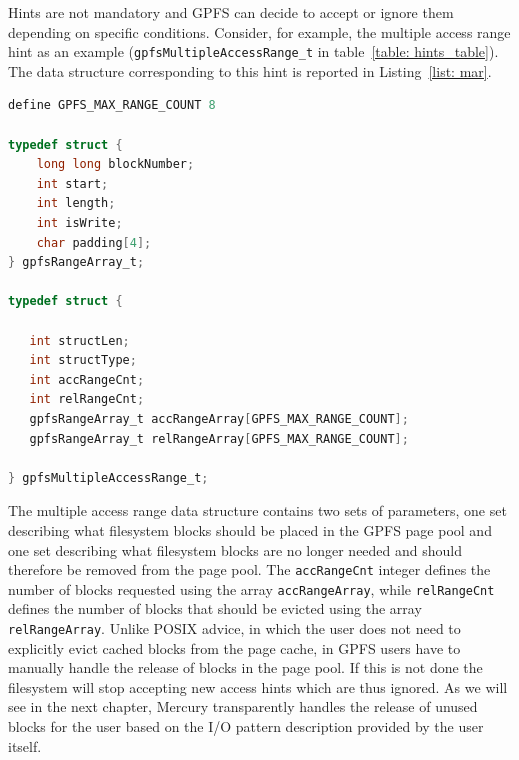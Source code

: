 Hints are not mandatory and GPFS can decide to accept or ignore them depending on specific conditions. Consider, for example, the multiple access range hint as an example (\texttt{gpfsMultipleAccessRange\_t} 
in table~\ref{table: hints_table}). The data structure corresponding to this hint is reported in Listing~\ref{list: mar}. 

\begin{lstlisting}[language=C, caption=Multiple Access Range Hint Data Structure, label={list: mar}, basicstyle=\ttfamily\scriptsize]
define GPFS_MAX_RANGE_COUNT 8

typedef struct {
    long long blockNumber;
    int start;
    int length;
    int isWrite;
    char padding[4];
} gpfsRangeArray_t;

typedef struct {

   int structLen;
   int structType;
   int accRangeCnt;
   int relRangeCnt;
   gpfsRangeArray_t accRangeArray[GPFS_MAX_RANGE_COUNT];
   gpfsRangeArray_t relRangeArray[GPFS_MAX_RANGE_COUNT];

} gpfsMultipleAccessRange_t;

\end{lstlisting}

The multiple access range data structure contains two sets of parameters, one set describing what filesystem blocks should be placed in the GPFS page pool and one set describing what filesystem blocks are 
no longer needed and should therefore be removed from the page pool. The \texttt{accRangeCnt} integer defines the number of blocks requested using the array \texttt{accRangeArray}, while \texttt{relRangeCnt} defines 
the number of blocks that should be evicted using the array \texttt{relRangeArray}. Unlike POSIX advice, in which the user does not need to explicitly evict cached blocks from the page cache, in GPFS users have 
to manually handle the release of blocks in the page pool. If this is not done the filesystem will stop accepting new access hints which are thus ignored. As we will see in the next chapter, Mercury transparently
handles the release of unused blocks for the user based on the I/O pattern description provided by the user itself.

